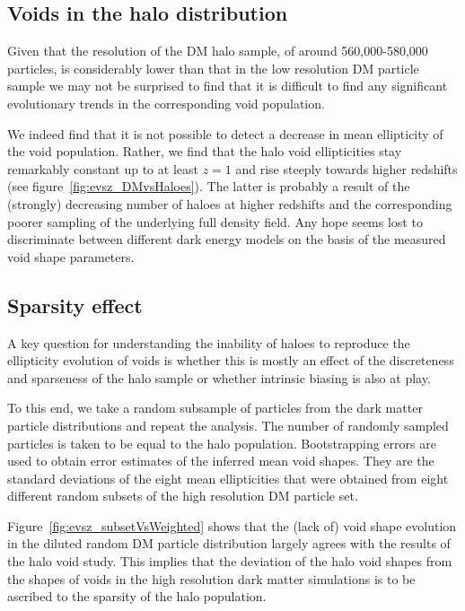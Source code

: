 \subsection{Voids in the halo distribution}
\label{sec:dmVShaloes}
Given that the resolution of the DM halo sample, of around 560,000-580,000 particles, is considerably lower than 
that in the low resolution DM particle sample we may not be surprised to find that it is difficult to 
find any significant evolutionary trends in the corresponding void population. 

We indeed find that it is not possible to detect a decrease in mean ellipticity of the void population. Rather,
we find that the halo void ellipticities stay remarkably constant up to at least $z=1$ and 
rise steeply towards higher redshifts (see figure~\ref{fig:evsz_DMvsHaloes}). The latter is probably a result 
of the (strongly) decreasing number of haloes at higher redshifts and the corresponding poorer sampling of the 
underlying full density field. Any hope seems lost to discriminate between different dark energy models on the 
basis of the measured void shape parameters. 

\subsection{Sparsity effect}
\label{sec:haloesVSsubsets}
A key question for understanding the inability of haloes to reproduce the ellipticity evolution of 
voids is whether this is mostly an effect of the discreteness and sparseness of the halo sample or 
whether intrinsic biasing is also at play. 

To this end, we take a random subsample of particles from the dark matter particle distributions and 
repeat the analysis. The number of randomly sampled particles is taken to be equal to the halo population. 
Bootstrapping errors are used to obtain error estimates of the inferred mean void shapes. They are the 
standard deviations of the eight mean ellipticities that were obtained from eight different random subsets 
of the high resolution DM particle set.

Figure~\ref{fig:evsz_subsetVsWeighted} shows that the (lack of) void shape evolution in the diluted random 
DM particle distribution largely agrees with the results of the halo void study. This implies that the 
deviation of the halo void shapes from the shapes of voids in the high resolution dark matter simulations 
is to be ascribed to the sparsity of the halo population. 

